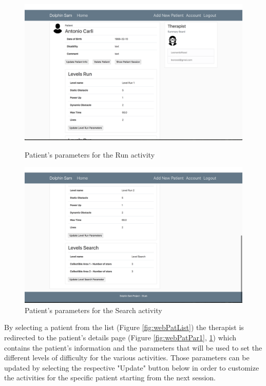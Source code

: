 \begin{figure}[h]
	\centering
	\begin{minipage}[b]{0.49\textwidth}
		\includegraphics[width=\textwidth]{images/UX/website/7-detailPatient}
		\caption{Patient's parameters for the Run activity}
		\label{fig:webPatPar1}
	\end{minipage}
	\begin{minipage}[b]{0.49\textwidth}
		\includegraphics[width=\textwidth]{images/UX/website/8-detailPatient}
		\caption{Patient's parameters for the Search activity}
		\label{fig:webPatPar2}
	\end{minipage}
\end{figure}

By selecting a patient from the list (Figure  \ref{fig:webPatList})  the therapist is redirected to the patient's details page (Figure \ref{fig:webPatPar1}, \ref{fig:webPatPar2}) which contains the patient's information and the parameters that will be used to set the different levels of difficulty for the various activities. Those parameters can be updated by selecting the respective "Update" button below in order to customize the activities for the specific patient starting from the next session.

